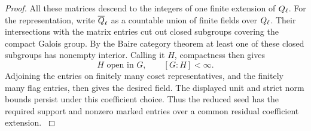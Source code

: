 \begin{proof}
All these matrices descend to the integers of one
finite extension of \(Q_\ell\). For the representation,
write \(\overline{Q}_\ell\) as a countable union of
finite fields over \(Q_\ell\). Their intersections
with the matrix entries cut out closed subgroups
covering the compact Galois group. By the Baire category theorem at least one of these closed subgroups has nonempty interior. Calling it \(H\), compactness then gives
\[
 H\text{ open in }G,\qquad [G:H]<\infty .
\] Adjoining the entries on finitely
many coset representatives, and the finitely many
flag entries, then gives the desired field.
The displayed unit and strict norm bounds persist
under this coefficient choice. Thus the reduced seed
has the required support and nonzero marked entries
over a common residual coefficient extension.
\label{cor:cohomology-count-two-seed-1}
\end{proof}
